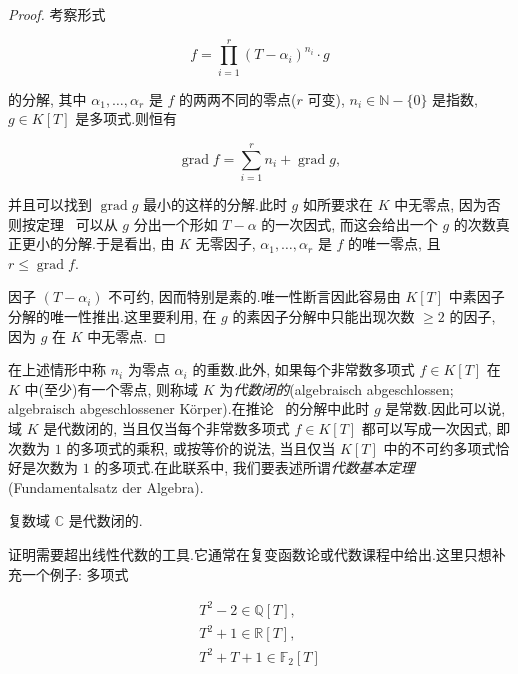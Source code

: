 \begin{proof}
考察形式

\[
f = \prod_{i = 1}^{r} (T - \alpha_i)^{n_i} \cdot g
\]

的分解, 其中 $\alpha_1, \ldots, \alpha_r$ 是 $f$ 的两两不同的零点($r$ 可变), $n_i \in \mathbb{N} - \{0\}$ 是指数, $g \in K[T]$ 是多项式.则恒有

\[
\operatorname{grad} f = \sum_{i = 1}^{r} n_i + \operatorname{grad} g,
\]

并且可以找到 $\operatorname{grad} g$ 最小的这样的分解.此时 $g$ 如所要求在 $K$ 中无零点, 因为否则按定理~ 可以从 $g$ 分出一个形如 $T - \alpha$ 的一次因式, 而这会给出一个 $g$ 的次数真正更小的分解.于是看出, 由 $K$ 无零因子, $\alpha_1, \ldots, \alpha_r$ 是 $f$ 的唯一零点, 且 $r \leq \operatorname{grad} f$.

因子 $(T - \alpha_i)$ 不可约, 因而特别是素的.唯一性断言因此容易由 $K[T]$ 中素因子分解的唯一性推出.这里要利用, 在 $g$ 的素因子分解中只能出现次数 $\geq 2$ 的因子, 因为 $g$ 在 $K$ 中无零点.
\end{proof}

在上述情形中称 $n_i$ 为零点 $\alpha_i$ 的重数.此外, 如果每个非常数多项式 $f \in K[T]$ 在 $K$ 中(至少)有一个零点, 则称域 $K$ 为\emph{代数闭的}(\textup{algebraisch abgeschlossen; algebraisch abgeschlossener Körper}).在推论~ 的分解中此时 $g$ 是常数.因此可以说, 域 $K$ 是代数闭的, 当且仅当每个非常数多项式 $f \in K[T]$ 都可以写成一次因式, 即次数为 $1$ 的多项式的乘积, 或按等价的说法, 当且仅当 $K[T]$ 中的不可约多项式恰好是次数为 $1$ 的多项式.在此联系中, 我们要表述所谓\emph{代数基本定理}(\textup{Fundamentalsatz der Algebra}).

\begin{bigtheorem}\label{bigthm:5.3.3}
复数域 $\mathbb{C}$ 是代数闭的.
\end{bigtheorem}

证明需要超出线性代数的工具.它通常在复变函数论或代数课程中给出.这里只想补充一个例子: 多项式

\[
\begin{array}{l}
T^2 - 2 \in \mathbb{Q}[T], \\
T^2 + 1 \in \mathbb{R}[T], \\
T^2 + T + 1 \in \mathbb{F}_2[T]
\end{array}
\]

